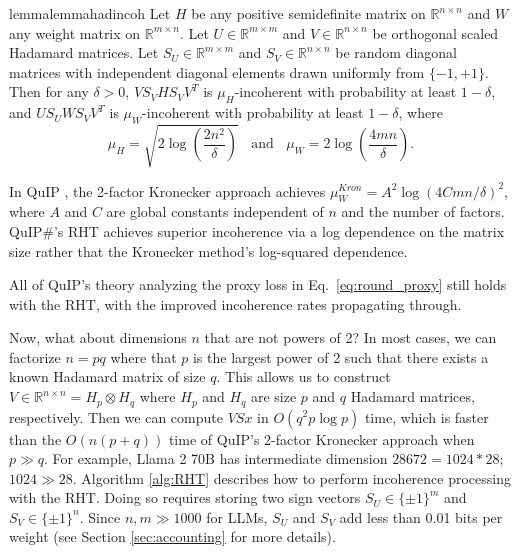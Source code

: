 \begin{restatable}{lemma}{lemmahadincoh}
\label{lemma:had_incoh}
Let $H$ be any positive semidefinite matrix on $\mathbb{R}^{n \times n}$ and $W$ any weight matrix on $\mathbb{R}^{m \times n}$. Let $U \in \mathbb{R}^{m \times m}$ and $V \in \mathbb{R}^{n \times n}$ be orthogonal scaled Hadamard matrices. Let $S_U \in \mathbb{R}^{m \times m}$ and $S_V \in \mathbb{R}^{n \times n}$ be random diagonal matrices with independent diagonal elements drawn uniformly from $\{-1,+1\}$.
Then for any $\delta > 0$, $V S_V H S_V V^T$ is $\mu_H$-incoherent with probability at least $1 - \delta$, and $U S_U W S_V V^T$ is $\mu_W$-incoherent with probability at least $1 - \delta$, where
\[
\mu_H = \sqrt{2 \log\left( \frac{2 n^2}{\delta} \right)}
\;\;\text{  and  }\;\;
\mu_W = 2 \log\left( \frac{4 mn}{\delta} \right).
\]
\end{restatable}

In QuIP \cite{chee2023quip}, the 2-factor Kronecker approach achieves $\mu_W^{Kron} = A^2 \log\left( 4 C m n / \delta \right)^2$, where $A$ and $C$ are global constants independent of $n$ and the number of factors.
QuIP$\#$'s RHT achieves superior incoherence via a log dependence on the matrix size rather that the Kronecker method's log-squared dependence.

All of QuIP's theory analyzing the proxy loss in Eq.~\eqref{eq:round_proxy} still holds with the RHT, with the improved incoherence rates propagating through.

Now, what about dimensions $n$ that are not powers of 2? In most cases, we can factorize $n = pq$ where that $p$ is the largest power of 2 such that there exists a known Hadamard matrix of size $q$. This allows us to construct $V \in \mathbb{R}^{n \times n} = H_p \otimes H_q$ where $H_p$ and $H_q$ are size $p$ and $q$ Hadamard matrices, respectively. Then we can compute $VSx$ in $O(q^2 p \log p)$ time, which is faster than the $O(n(p+q))$ time of QuIP's 2-factor Kronecker approach when $p \gg q$. For example, Llama 2 70B has intermediate dimension $28672 = 1024 * 28$; $1024 \gg 28$. Algorithm \ref{alg:RHT} describes how to perform incoherence processing with the RHT. Doing so requires storing two sign vectors $S_U \in \{\pm 1\}^m$ and $S_V \in \{\pm 1\}^n$.
Since $n, m \gg 1000$ for LLMs, $S_U$ and $S_V$ add less than 0.01 bits per weight (see Section \ref{sec:accounting} for more details).

